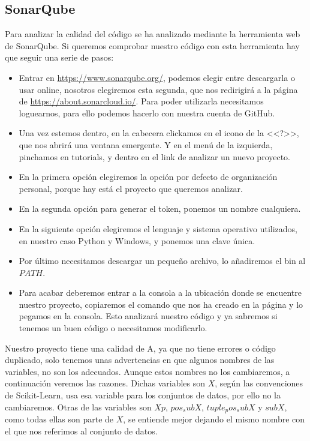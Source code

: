 \subsection{SonarQube}
Para analizar la calidad del código se ha analizado mediante la herramienta web de SonarQube.
Si queremos comprobar nuestro código con esta herramienta hay que seguir una serie de pasos:
\begin{itemize}
	\item Entrar en \url{https://www.sonarqube.org/}, podemos elegir entre descargarla o usar online, nosotros elegiremos esta segunda, que nos redirigirá a la página de \url{https://about.sonarcloud.io/}. Para poder utilizarla necesitamos loguearnos, para ello podemos hacerlo con nuestra cuenta de GitHub.
	\item Una vez estemos dentro, en la cabecera clickamos en el icono de la <<?>>, que nos abrirá una ventana emergente. Y en el menú de la izquierda, pinchamos en tutorials, y dentro en el link de analizar un nuevo proyecto.
	\item En la primera opción elegiremos la opción por defecto de organización personal, porque hay está el proyecto que queremos analizar.
	\item En la segunda opción para generar el token, ponemos un nombre cualquiera.
	\item En la siguiente opción elegiremos el lenguaje y sistema operativo utilizados, en nuestro caso Python y Windows, y ponemos una clave única.
	\item Por último necesitamos descargar un pequeño archivo, lo añadiremos el bin al $PATH$.
	\item Para acabar deberemos entrar a la consola a la ubicación donde se encuentre nuestro proyecto, copiaremos el comando que nos ha creado en la página y lo pegamos en la consola. Esto analizará nuestro código y ya sabremos si tenemos un buen código o necesitamos modificarlo.
\end{itemize}

Nuestro proyecto tiene una  calidad de A, ya que no tiene errores o código duplicado, solo tenemos unas advertencias en que algunos nombres de las variables, no son los adecuados. Aunque estos nombres no los cambiaremos, a continuación veremos las razones. Dichas variables son $X$, según las convenciones de Scikit-Learn, usa esa variable para los conjuntos de datos, por ello no la cambiaremos. Otras de las variables son $Xp$, $pos_subX$, $tuple_pos_subX$ y $subX$,  como todas ellas son parte de $X$, se entiende mejor dejando el mismo nombre con el que nos referimos al conjunto de datos.


